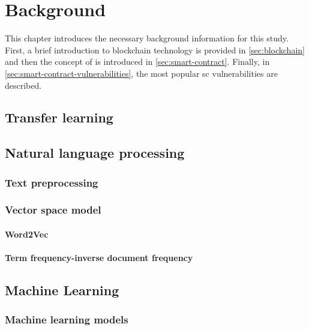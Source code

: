 \chapter{Background}
\label{chap:background}
This chapter introduces the necessary background information for this study. First, a brief introduction to blockchain technology is provided in \cref{sec:blockchain} and then the concept of  is introduced in \cref{sec:smart-contract}. Finally, in \cref{sec:smart-contract-vulnerabilities}, the most popular \acrshort{sc} vulnerabilities are described.

\section{Transfer learning}
\label{sec:transfer-learning}

\section{Natural language processing}
\label{sec:natural-language-processing}

\subsection{Text preprocessing}
\label{sec:textt-preprocessing}

\subsection{Vector space model}
\label{sec:vector-space-model}

\subsubsection{Word2Vec}
\label{sec:vord2vec}

\subsubsection{Term frequency-inverse document frequency}
\label{sec:tf-idf}


\section{Machine Learning}
\label{sec:machine-learning}

\subsection{Machine learning models}
\label{sec:machine-learning-models}

